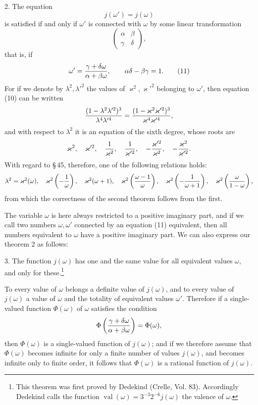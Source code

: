\documentclass[11pt]{article}
\begin{document}
2. The equation
\begin{equation}
j(\omega')=j(\omega)
\tag{10}
\end{equation}
is satisfied if and only if $\omega'$ is connected with $\omega$ by some linear transformation
\[
\begin{pmatrix}\alpha&\beta\\ \gamma&\delta\end{pmatrix},
\]
that is, if
\begin{equation}
\omega'={\gamma+\delta\omega\over\alpha+\beta\omega},
\qquad
\alpha\delta-\beta\gamma=1.
\tag{11}
\end{equation}
For if we denote by $\lambda^2,\lambda'^2$ the values of $\varkappa^2,\varkappa'^2$ belonging to $\omega'$, then equation (10) can be written
\[
{(1-\lambda^2\lambda'^2)^3\over\lambda^4\lambda'^4}
={ (1-\varkappa^2\varkappa'^2)^3\over\varkappa^4\varkappa'^4},
\]
and with respect to $\lambda^2$ it is an equation of the sixth degree, whose roots are
\[
\varkappa^2,
\quad \varkappa'^2,
\quad {1\over\varkappa^2},
\quad {1\over\varkappa'^2},
\quad -{\varkappa'^2\over\varkappa^2},
\quad -{\varkappa^2\over\varkappa'^2}.
\]
With regard to \S\,45, therefore, one of the following relations holds:
\[
\lambda^2=\varkappa^2(\omega),
\quad \varkappa^2\left(-{1\over\omega}\right),
\quad \varkappa^2(\omega+1),
\quad \varkappa^2\left({\omega-1\over\omega}\right),
\quad \varkappa^2\left(-{1\over\omega+1}\right),
\quad \varkappa^2\left({\omega\over1-\omega}\right),
\]
from which the correctness of the second theorem follows from the first.

The variable $\omega$ is here always restricted to a positive imaginary part, and if we call two numbers $\omega,\omega'$ connected by an equation (11) equivalent, then all numbers equivalent to $\omega$ have a positive imaginary part. We can also express our theorem 2 as follows:

3. The function $j(\omega)$ has one and the same value for all equivalent values $\omega$, and only for these.\footnote{This theorem was first proved by Dedekind (Crelle, Vol. 83). Accordingly Dedekind calls the function $\operatorname{val}(\omega)=3^{-3}2^{-6}j(\omega)$ the valence of $\omega$.}

To every value of $\omega$ belongs a definite value of $j(\omega)$, and to every value of $j(\omega)$ a value of $\omega$ and the totality of equivalent values $\omega'$. Therefore if a single-valued function $\Phi(\omega)$ of $\omega$ satisfies the condition
\[
\Phi\left({\gamma+\delta\omega\over\alpha+\beta\omega}\right)=\Phi(\omega),
\]
then $\Phi(\omega)$ is a single-valued function of $j(\omega)$; and if we therefore assume that $\Phi(\omega)$ becomes infinite for only a finite number of values $j(\omega)$, and becomes infinite only to finite order, it follows that $\Phi(\omega)$ is a rational function of $j(\omega)$.
\end{document}
